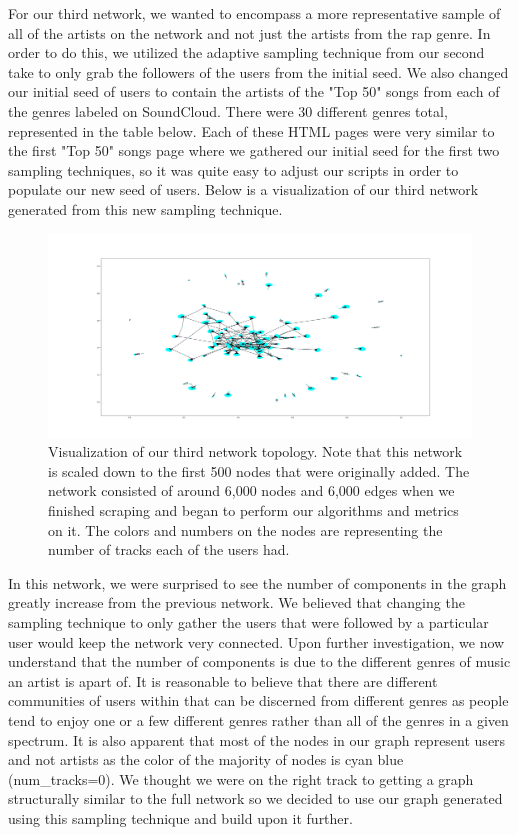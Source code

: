 \documentclass{article}
\begin{document}
For our third network, we wanted to encompass a more representative sample of all of the artists on the network and not just the artists from the rap genre.  In order to do this, we utilized the adaptive sampling technique from our second take to only grab the followers of the users from the initial seed.  We also changed our initial seed of users to contain the artists of the "Top 50" songs from each of the genres labeled on SoundCloud.  There were 30 different genres total, represented in the table below.  Each of these HTML pages were very similar to the first "Top 50" songs page where we gathered our initial seed for the first two sampling techniques, so it was quite easy to adjust our scripts in order to populate our new seed of users.  Below is a visualization of our third network generated from this new sampling technique.

\begin{figure}[h]
	\centering
	\includegraphics[scale=0.43]{take_3_visualization}
	\caption{Visualization of our third network topology.  Note that this network is scaled down to the first 500 nodes that were originally added.  The network consisted of around 6,000 nodes and 6,000 edges when we finished scraping and began to perform our algorithms and metrics on it.  The colors and numbers on the nodes are representing the number of tracks each of the users had.}
\end{figure}

In this network, we were surprised to see the number of components in the graph greatly increase from the previous network.  We believed that changing the sampling technique to only gather the users that were followed by a particular user would keep the network very connected.  Upon further investigation, we now understand that the number of components is due to the different genres of music an artist is apart of.  It is reasonable to believe that there are different communities of users within that can be discerned from different genres as people tend to enjoy one or a few different genres rather than all of the genres in a given spectrum.  It is also apparent that most of the nodes in our graph represent users and not artists as the color of the majority of nodes is cyan blue (num\_tracks=0).  We thought we were on the right track to getting a graph structurally similar to the full network so we decided to use our graph generated using this sampling technique and build upon it further.
\end{document}
